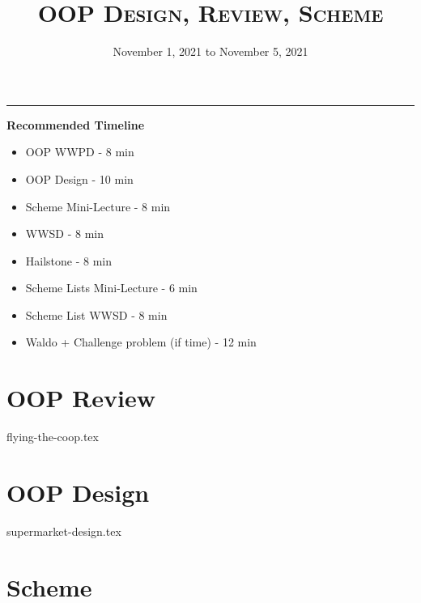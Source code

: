 \documentclass{exam}
\title{\textsc{OOP Design, Review, Scheme}}
\date{November 1, 2021 to November 5, 2021}
\begin{document}
\maketitle
\rule{\textwidth}{0.15em}
\fontsize{12}{15}\selectfont

\begin{guide}
\begin{blocksection}
\textbf{Recommended Timeline}
\begin{itemize}
  \item OOP WWPD - 8 min
  \item OOP Design - 10 min
  \item Scheme Mini-Lecture - 8 min
  \item WWSD - 8 min
  \item Hailstone - 8 min
  \item Scheme Lists Mini-Lecture - 6 min
  \item Scheme List WWSD - 8 min
  \item Waldo + Challenge problem (if time) - 12 min
\end{itemize}
\end{blocksection}
\end{guide}

\section{OOP Review}
\begin{questions}
{flying-the-coop.tex}
\end{questions}

\section{OOP Design}
\begin{questions}
{supermarket-design.tex}
\end{questions}
\newpage
\section{Scheme}
\end{document}
